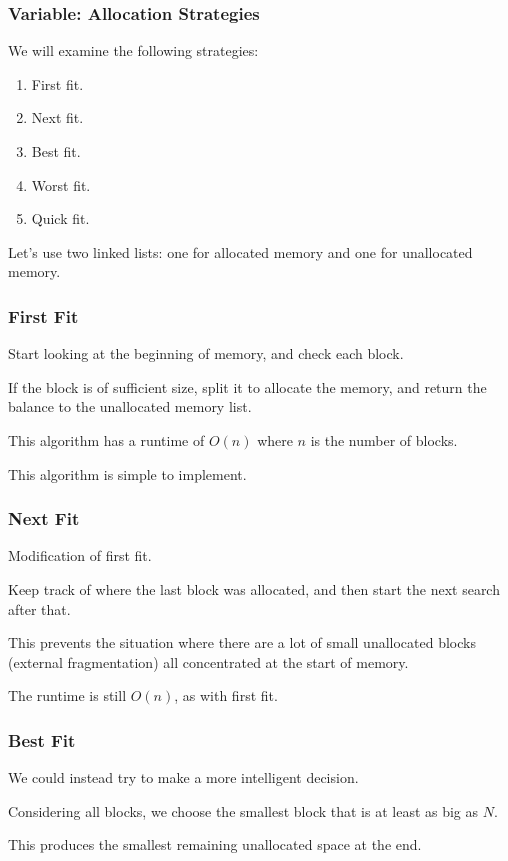 \begin{frame}
\frametitle{Variable: Allocation Strategies}

We will examine the following strategies:

\begin{enumerate}
	\item First fit.
	\item Next fit.
	\item Best fit.
	\item Worst fit.
	\item Quick fit.
\end{enumerate}

Let's use two linked lists: one for allocated memory and one for unallocated memory. 

\end{frame}

\begin{frame}
\frametitle{First Fit}

Start looking at the beginning of memory, and check each block. 

If the block is of sufficient size, split it to allocate the memory, and return the balance to the unallocated memory list. 

This algorithm has a runtime of $O(n)$ where $n$ is the number of blocks. 

This algorithm is simple to implement. 



\end{frame}

\begin{frame}
\frametitle{Next Fit}

Modification of first fit.

Keep track of where the last block was allocated, and then start the next search after that. 

This prevents the situation where there are a lot of small unallocated blocks (external fragmentation) all concentrated at the start of memory. 

The runtime is still $O(n)$, as with first fit.

\end{frame}



\begin{frame}
\frametitle{Best Fit}

We could instead try to make a more intelligent decision. 

Considering all blocks, we choose the smallest block that is at least as big as $N$.

This produces the smallest remaining unallocated space at the end. 

\end{frame}

